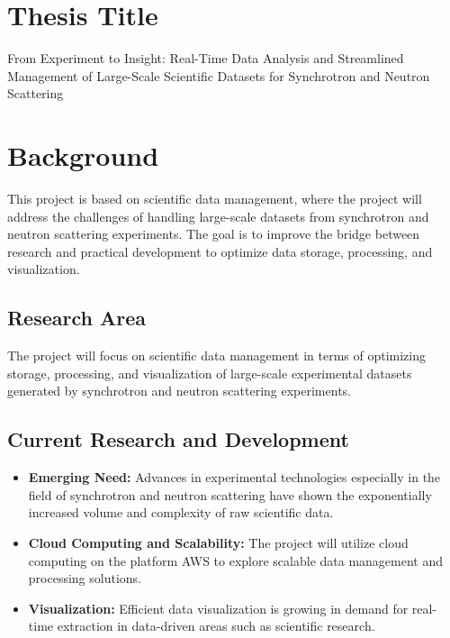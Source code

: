 \documentclass{article}
\begin{document}
\begin{comment}
ELIGIBILITY:
[Verify that you are eligible to start your degree project, that is,
that you fulfill the basic requirements of starting the project, and
also have completed all the courses that are relevant to the
project.]

STUDY PLANNING:
[List all the courses that you will need to complete during or after
the degree project, and describe how and when you plan to complete
those courses. This is aimed at ensuring that the thesis is one
of the last elements of your education.]
\end{comment}

\section{Thesis Title}
From Experiment to Insight: Real-Time Data Analysis and Streamlined Management of Large-Scale Scientific Datasets for Synchrotron and Neutron Scattering

\section{Background}
This project is based on scientific data management, where the project will address the challenges of handling large-scale datasets from synchrotron and neutron scattering experiments. The goal is to improve the bridge between research and practical development to optimize data storage, processing, and visualization.

\subsection{Research Area}
The project will focus on scientific data management in terms of optimizing storage, processing, and visualization of large-scale experimental datasets generated by synchrotron and neutron scattering experiments.

\subsection{Current Research and Development}
\begin{itemize}
    \item \textbf{Emerging Need:} Advances in experimental technologies especially in the field of synchrotron and neutron scattering have shown the exponentially increased volume and complexity of raw scientific data.
    \item \textbf{Cloud Computing and Scalability:} The project will utilize cloud computing on the platform AWS to explore scalable data management and processing solutions.
    \item \textbf{Visualization:} Efficient data visualization is growing in demand for real-time extraction in data-driven areas such as scientific research.
\end{itemize}
\end{document}
